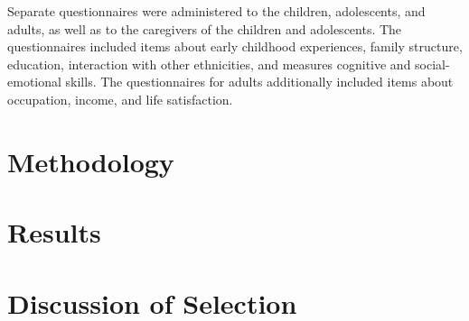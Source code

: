 Separate questionnaires were administered to the children, adolescents, and adults, as well as to the caregivers of the children and adolescents. The questionnaires included items about early childhood experiences, family structure, education, interaction with other ethnicities, and measures cognitive and social-emotional skills. The questionnaires for adults additionally included items about occupation, income, and life satisfaction. 

\section{Methodology}
\label{sec:methodology}



\section{Results}
\label{sec:results}

\section{Discussion of Selection}
\label{sec:selection}





